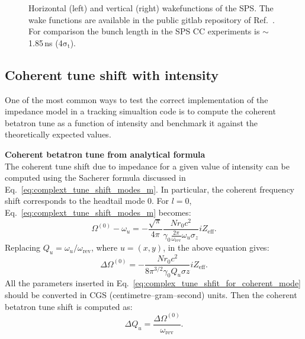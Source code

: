 \begin{figure}[!ht]
\begin{subfigure}[t]{0.45\textwidth}
    \end{subfigure}
    \hfill
     \caption{Horizontal (left) and vertical (right) wakefunctions of the SPS. The wake functions are available in the public gitlab repository of Ref.~\cite{sps_impedance_model_git}. For comparison the bunch length in the SPS CC experiments is $\sim$ 1.85\,ns (4$\mathrm{\sigma_t}$).} %
     \label{fig:sps_wakefunctions_model_H_V}
 \end{figure}




\subsection{Coherent tune shift with intensity}
One of the most common ways to test the correct implementation of the impedance model in a tracking simualtion code is to compute the coherent betatron tune as a function of intensity and benchmark it against the theoretically expected values.

\textbf{Coherent betatron tune from analytical formula}\\
The coherent tune shift due to impedance for a given value of intensity can be computed using the Sacherer formula discussed in Eq.~\eqref{eq:complext_tune_shift_modes_m}. In particular, the coherent frequency shift corresponds to the headtail mode 0. For $l=0$, Eq.~\eqref{eq:complext_tune_shift_modes_m} becomes:
\begin{equation}
    \Omega^{(0)} - \omega_u = - \frac{\sqrt{\pi}}{4 \pi}\frac{N r_0 c^2}{\gamma_0 \frac{2\pi}{\omega_\mathrm{rev}}\omega_u \sigma_z} i Z_\mathrm{eff}.
\end{equation}
Replacing $Q_u = \omega_u/\omega_\mathrm{rev}$, where $u=(x,y)$, in the above equation gives:
\begin{equation}\label{eq:complex_tune_shfit_for_coherent_mode}
    \Delta \Omega^{(0)} = - \frac{N r_0 c^2}{8 \pi^{3/2} \gamma_0 Q_u \sigma z} i Z_\mathrm{eff}.
\end{equation}
All the parameters inserted in Eq.~\eqref{eq:complex_tune_shfit_for_coherent_mode} should be converted in CGS (centimetre–gram–second) units.
Then the coherent betatron tune shift is computed as:
\begin{equation}
    \Delta Q_u = \frac{\Delta \Omega^{(0)}}{\omega_\mathrm{rev}}.
\end{equation}

